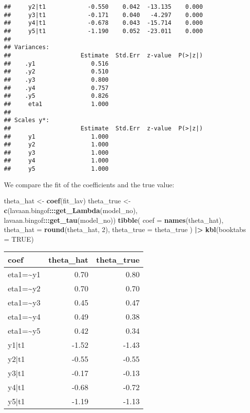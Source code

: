 \documentclass[
]{article}
\newenvironment{Shaded}{\begin{snugshade}}{\end{snugshade}}
\newcommand{\AttributeTok}[1]{\textcolor[rgb]{0.13,0.29,0.53}{#1}}
\newcommand{\ConstantTok}[1]{\textcolor[rgb]{0.56,0.35,0.01}{#1}}
\newcommand{\DecValTok}[1]{\textcolor[rgb]{0.00,0.00,0.81}{#1}}
\newcommand{\FunctionTok}[1]{\textcolor[rgb]{0.13,0.29,0.53}{\textbf{#1}}}
\newcommand{\NormalTok}[1]{#1}
\newcommand{\OtherTok}[1]{\textcolor[rgb]{0.56,0.35,0.01}{#1}}
\newcommand{\SpecialCharTok}[1]{\textcolor[rgb]{0.81,0.36,0.00}{\textbf{#1}}}
\begin{document}
\begin{verbatim}
##     y2|t1            -0.550    0.042  -13.135    0.000
##     y3|t1            -0.171    0.040   -4.297    0.000
##     y4|t1            -0.678    0.043  -15.714    0.000
##     y5|t1            -1.190    0.052  -23.011    0.000
## 
## Variances:
##                    Estimate  Std.Err  z-value  P(>|z|)
##    .y1                0.516                           
##    .y2                0.510                           
##    .y3                0.800                           
##    .y4                0.757                           
##    .y5                0.826                           
##     eta1              1.000                           
## 
## Scales y*:
##                    Estimate  Std.Err  z-value  P(>|z|)
##     y1                1.000                           
##     y2                1.000                           
##     y3                1.000                           
##     y4                1.000                           
##     y5                1.000
\end{verbatim}

We compare the fit of the coefficients and the true value:

\begin{Shaded}
\begin{Highlighting}[]
\NormalTok{theta\_hat }\OtherTok{\textless{}{-}} \FunctionTok{coef}\NormalTok{(fit\_lav)}
\NormalTok{theta\_true }\OtherTok{\textless{}{-}} \FunctionTok{c}\NormalTok{(lavaan.bingof}\SpecialCharTok{:::}\FunctionTok{get\_Lambda}\NormalTok{(model\_no),}
\NormalTok{                lavaan.bingof}\SpecialCharTok{:::}\FunctionTok{get\_tau}\NormalTok{(model\_no))}
\FunctionTok{tibble}\NormalTok{(}
  \AttributeTok{coef =} \FunctionTok{names}\NormalTok{(theta\_hat),}
  \AttributeTok{theta\_hat =} \FunctionTok{round}\NormalTok{(theta\_hat, }\DecValTok{2}\NormalTok{),}
  \AttributeTok{theta\_true =}\NormalTok{ theta\_true}
\NormalTok{) }\SpecialCharTok{|\textgreater{}}
  \FunctionTok{kbl}\NormalTok{(}\AttributeTok{booktabs =} \ConstantTok{TRUE}\NormalTok{)}
\end{Highlighting}
\end{Shaded}

\begin{tabular}[t]{lrr}
\toprule
coef & theta\_hat & theta\_true\\
\midrule
eta1=\textasciitilde{}y1 & 0.70 & 0.80\\
eta1=\textasciitilde{}y2 & 0.70 & 0.70\\
eta1=\textasciitilde{}y3 & 0.45 & 0.47\\
eta1=\textasciitilde{}y4 & 0.49 & 0.38\\
eta1=\textasciitilde{}y5 & 0.42 & 0.34\\
\addlinespace
y1|t1 & -1.52 & -1.43\\
y2|t1 & -0.55 & -0.55\\
y3|t1 & -0.17 & -0.13\\
y4|t1 & -0.68 & -0.72\\
y5|t1 & -1.19 & -1.13\\
\bottomrule
\end{tabular}
\end{document}
